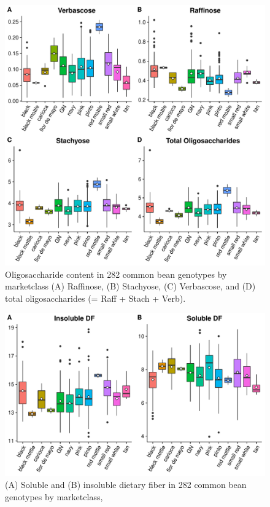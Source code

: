 \documentclass[11pt,]{article}
\makeatletter
\def\maxwidth{\ifdim\Gin@nat@width>\linewidth\linewidth
\else\Gin@nat@width\fi}
\let\Oldincludegraphics\includegraphics
\renewcommand{\includegraphics}[1]{\Oldincludegraphics[width=\maxwidth]{#1}}
\makeatother
\begin{document}
\begin{figure}

{\centering \includegraphics{./manuscript_template_files/figure-latex/unnamed-chunk-10-1} 

}

\caption{Oligosaccharide content in 282 common bean genotypes by marketclass (A) Raffinose, (B) Stachyose, (C) Verbascose, and (D) total oligosaccharides (= Raff + Stach + Verb).}\label{fig:unnamed-chunk-10}
\end{figure}

\begin{figure}

{\centering \includegraphics{./manuscript_template_files/figure-latex/unnamed-chunk-11-1} 

}

\caption{(A) Soluble and (B) insoluble dietary fiber in 282 common bean genotypes by marketclass,}\label{fig:unnamed-chunk-11}
\end{figure}
\end{document}
